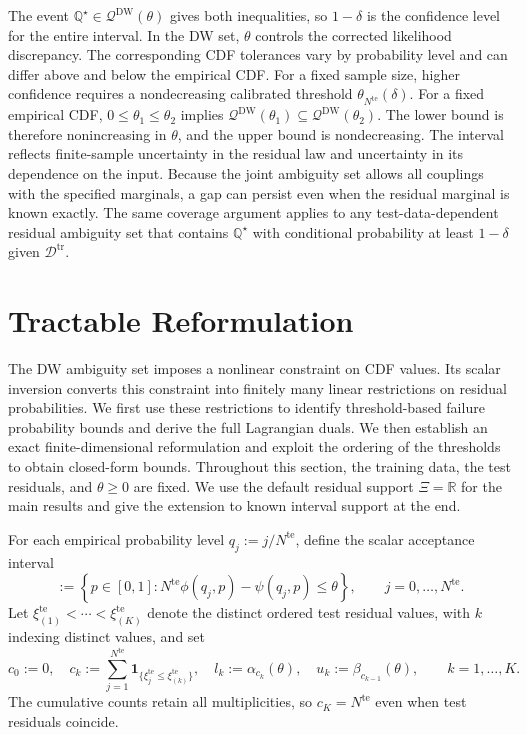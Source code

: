 \documentclass[review,11pt,3p,authoryear,nopreprintline]{elsarticle}
\begin{document}
The event $\mathbb Q^\star\in\mathscr Q^{\mathrm{DW}}(\theta)$ gives both inequalities, so $1-\delta$ is the confidence level for the entire interval. In the DW set, $\theta$ controls the corrected likelihood discrepancy. The corresponding CDF tolerances vary by probability level and can differ above and below the empirical CDF. For a fixed sample size, higher confidence requires a nondecreasing calibrated threshold $\theta_{N^{\mathrm{te}}}(\delta)$. For a fixed empirical CDF, $0\le\theta_1\le\theta_2$ implies $\mathscr Q^{\mathrm{DW}}(\theta_1)\subseteq\mathscr Q^{\mathrm{DW}}(\theta_2)$. The lower bound is therefore nonincreasing in $\theta$, and the upper bound is nondecreasing. The interval reflects finite-sample uncertainty in the residual law and uncertainty in its dependence on the input. Because the joint ambiguity set allows all couplings with the specified marginals, a gap can persist even when the residual marginal is known exactly. The same coverage argument applies to any test-data-dependent residual ambiguity set that contains $\mathbb Q^\star$ with conditional probability at least $1-\delta$ given $\mathcal D^{\mathrm{tr}}$.


\section{Tractable Reformulation}
\label{sec-reformulation}

The DW ambiguity set imposes a nonlinear constraint on CDF values. Its scalar inversion converts this constraint into finitely many linear restrictions on residual probabilities. We first use these restrictions to identify threshold-based failure probability bounds and derive the full Lagrangian duals. We then establish an exact finite-dimensional reformulation and exploit the ordering of the thresholds to obtain closed-form bounds. Throughout this section, the training data, the test residuals, and $\theta\ge0$ are fixed. We use the default residual support $\Xi=\mathbb R$ for the main results and give the extension to known interval support at the end.

For each empirical probability level $q_j:=j/N^{\mathrm{te}}$, define the scalar acceptance interval
\begin{equation}
  [\alpha_j(\theta),\beta_j(\theta)]
  :=\left\{p\in[0,1]:
  N^{\mathrm{te}}\phi(q_j,p)-\psi(q_j,p)\le\theta\right\},
  \qquad j=0,\ldots,N^{\mathrm{te}}.
  \label{eq-dw-rank-acceptance}
\end{equation}
Let $\xi_{(1)}^{\mathrm{te}}<\cdots<\xi_{(K)}^{\mathrm{te}}$ denote the distinct ordered test residual values, with $k$ indexing distinct values, and set
\begin{equation} 
    c_0 :=0, \quad
    c_k :=\sum_{j=1}^{N^{\mathrm{te}}}\mathbf1_{\{\xi_j^{\mathrm{te}}\le\xi_{(k)}^{\mathrm{te}}\}}, \quad
    l_k :=\alpha_{c_k}(\theta),  \quad
    u_k :=\beta_{c_{k-1}}(\theta),\qquad k=1,\ldots,K. 
  \label{eq-dw-counts-and-levels}
\end{equation}
The cumulative counts retain all multiplicities, so $c_K=N^{\mathrm{te}}$ even when test residuals coincide.
\end{document}
